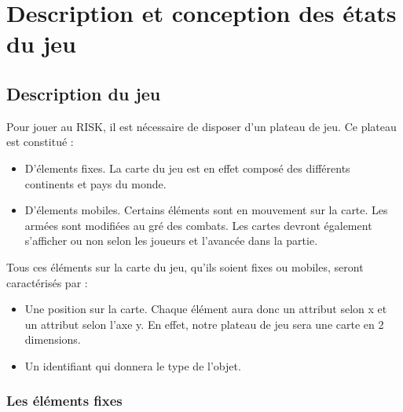 \section{Description et conception des états du jeu}

\subsection{Description du jeu}

Pour jouer au RISK, il est nécessaire de disposer d'un plateau de jeu. Ce plateau est constitué : 

\begin{itemize}
    \item D'élements fixes. La carte du jeu est en effet composé des différents continents et pays du monde. 
    \item D'élements mobiles. Certains éléments sont en mouvement sur la carte. Les armées sont modifiées au gré des combats. Les cartes devront également s'afficher ou non selon les joueurs et l'avancée dans la partie.
    \newline
\end{itemize}

Tous ces éléments sur la carte du jeu, qu'ils soient fixes ou mobiles, seront caractérisés par :
\begin{itemize}
    \item Une position sur la carte. Chaque élément aura donc un attribut selon x et un attribut selon l'axe y. En effet, notre plateau de jeu sera une carte en 2 dimensions. 
    \item Un identifiant qui donnera le type de l'objet. 
\end{itemize}

\subsubsection{Les éléments fixes}

